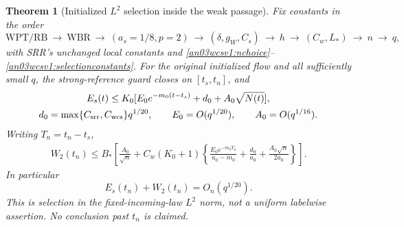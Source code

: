 \documentclass[11pt]{article}
\numberwithin{equation}{section}
\newtheorem{theorem}{Theorem}[section]
\theoremstyle{remark}\newtheorem{remark}[theorem]{Remark}
\begin{document}
\begin{theorem}[Initialized $L^2$ selection inside the weak passage]
\label{an03wcsv1:main}
Fix constants in the order
\[
 \mathrm{WPT/RB}\ \longrightarrow\ \mathrm{WBR}\
 \longrightarrow\ (a_s=1/8,p=2)\
 \longrightarrow\ (\delta,g_W,C_s)\
 \longrightarrow\ h\ \longrightarrow\ (C_w,L_*)\
 \longrightarrow\ n\ \longrightarrow\ q,
\]
with SRR's unchanged local constants and
\eqref{an03wcsv1:nchoice}--\eqref{an03wcsv1:selectionconstants}.
For the original initialized flow and all sufficiently small $q$,
the strong-reference guard closes on $[t_s,t_n]$, and
\begin{equation}
 \begin{gathered}
 E_s(t)\le K_0[E_0e^{-m_0(t-t_s)}+d_0+A_0\sqrt{N(t)}],\\
 d_0=\max\{C_{\rm srr},C_{\rm wcs}\}q^{1/20},\qquad
 E_0=O(q^{1/20}),\qquad A_0=O(q^{1/16}).
 \end{gathered}
 \label{an03wcsv1:Econclusion}
\end{equation}
Writing $T_n=t_n-t_s$,
\begin{align}
 W_2(t_n)\le B_*\left[\frac{A_0}{\sqrt n}
 +C_w(K_0+1)\left\{
 \frac{E_0e^{-m_0T_n}}{a_0-m_0}+\frac{d_0}{a_0}
                           +\frac{A_0\sqrt n}{2a_0}\right\}\right].
 \label{an03wcsv1:Wconclusion}
\end{align}
In particular
\begin{equation}
 E_s(t_n)+W_2(t_n)=O_n(q^{1/20}).
 \label{an03wcsv1:rates}
\end{equation}
This is selection in the fixed-incoming-law $L^2$ norm, not a
uniform labelwise assertion. No conclusion past $t_n$ is claimed.
\end{theorem}
\end{document}
